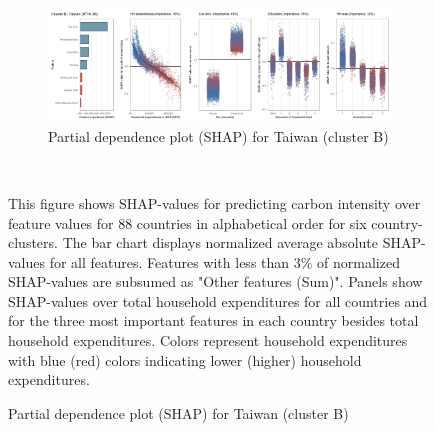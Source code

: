 \begin{figure}[ht!]
    \\
    \vspace{0.5cm}
   \begin{subfigure}[b]{\textwidth}
    \centering
         \caption{Partial dependence plot (SHAP) for Taiwan (cluster B)}
         \label{fig:5b_TWN}
         \includegraphics[width=\textwidth]{Figure 5b/Figure_5b_TWN} 
         \end{subfigure}
    \\
    \vspace{0.5cm}
   
    \begin{subcaption2}
     This figure shows SHAP-values for predicting carbon intensity over feature values for 88 countries in alphabetical order for six country-clusters. The bar chart displays normalized average absolute SHAP-values for all features. Features with less than 3\% of normalized SHAP-values are subsumed as "Other features (Sum)". Panels show SHAP-values over total household expenditures for all countries and for the three most important features in each country besides total household expenditures. Colors represent household expenditures with blue (red) colors indicating lower (higher) household expenditures.
     \end{subcaption2}
\end{figure}

